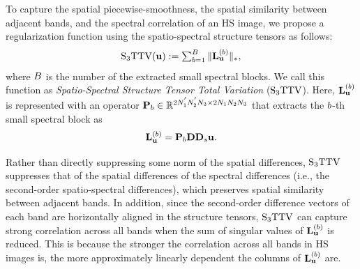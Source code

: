 \documentclass[10pt,journal]{IEEEtran}
\begin{document}
To capture the spatial piecewise-smoothness, the spatial similarity between adjacent bands, and the spectral correlation of an HS image, we propose a regularization function using the spatio-spectral structure tensors as follows:
\begin{equation}
    \label{eq:S3TTV_Lu}
    \textstyle {\text{S}_{3} \text{TTV}} (\mathbf{u}) := \sum_{b=1}^{B} \| \mathbf{L}_{\mathbf{u}}^{(b)} \|_{*},
\end{equation}
where $B$ is the number of the extracted small spectral blocks.
We call this function as \textit{Spatio-Spectral Structure Tensor Total Variation} (${\text{S}_{3} \text{TTV}}$).
Here, $\mathbf{L}_{\mathbf{u}}^{(b)}$ is represented with an operator $\mathbf{P}_{b} \in \mathbb{R}^{2 N_{1}^{'} N_{2}^{'} N_{3} \times 2 N_{1} N_{2} N_{3}}$ that extracts the $b$-th small spectral block as
\begin{equation}
    \label{eq:rewrite_Lu}
    \mathbf{L}_{\mathbf{u}}^{(b)}
    = \mathbf{P}_{b} \mathbf{D} \mathbf{D}_{s} \mathbf{u}.
\end{equation}

Rather than directly suppressing some norm of the spatial differences, ${\text{S}_{3} \text{TTV}}$ suppresses that of the spatial differences of the spectral differences (i.e., the second-order spatio-spectral differences), which preserves spatial similarity between adjacent bands.
In addition, since the second-order difference vectors of each band are horizontally aligned in the structure tensors, ${\text{S}_{3} \text{TTV}}$ can capture strong correlation across all bands when the sum of singular values of $\mathbf{L}_{\mathbf{u}}^{(b)}$ is reduced.
This is because the stronger the correlation across all bands in HS images is, the more approximately linearly dependent the columns of $\mathbf{L}_{\mathbf{u}}^{(b)}$ are.
\end{document}
